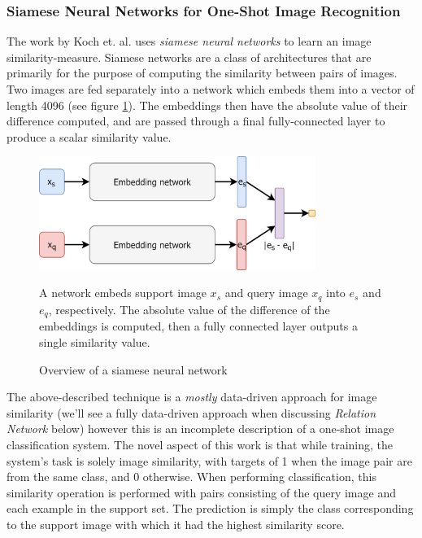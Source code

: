 \documentclass{report}
\begin{document}
\subsubsection{Siamese Neural Networks for One-Shot Image Recognition}
The work by Koch et. al. \parencite{siamese} uses \textit{siamese neural networks} to learn an image similarity-measure. Siamese networks are a class of architectures that are primarily for the purpose of computing the similarity between pairs of images. Two images are fed separately into a network which embeds them into a vector of length 4096 (see figure \ref{fig:siamese:2}). The embeddings then have the absolute value of their difference computed, and are passed through a final fully-connected layer to produce a scalar similarity value. \par
\begin{figure}[h]
 \centering
 \includegraphics[width=9cm]{siamese}
 \caption{Overview of a siamese neural network}
 A network embeds support image $x_s$ and query image $x_q$ into $e_s$ and $e_q$, respectively. The absolute value of the difference of the embeddings is computed, then a fully connected layer outputs a single similarity value.
 \label{fig:siamese:2}
\end{figure}
The above-described technique is a \emph{mostly} data-driven approach for image similarity (we'll see a fully data-driven approach when discussing \textit{Relation Network} below) however this is an incomplete description of a one-shot image classification system. The novel aspect of this work is that while training, the system's task is solely image similarity, with targets of 1 when the image pair are from the same class, and 0 otherwise. When performing classification, this similarity operation is performed with pairs consisting of the query image and each example in the support set. The prediction is simply the class corresponding to the support image with which it had the highest similarity score. \par
\end{document}
